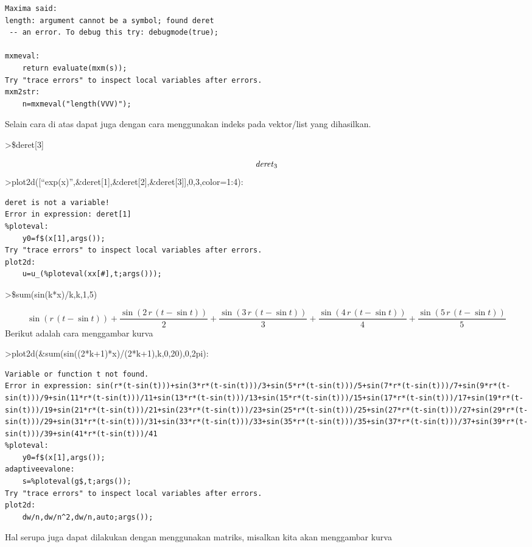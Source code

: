 \documentclass[
]{book}
\begin{document}
\begin{verbatim}
Maxima said:
length: argument cannot be a symbol; found deret
 -- an error. To debug this try: debugmode(true);

mxmeval:
    return evaluate(mxm(s));
Try "trace errors" to inspect local variables after errors.
mxm2str:
    n=mxmeval("length(VVV)");
\end{verbatim}

Selain cara di atas dapat juga dengan cara menggunakan indeks pada vektor/list yang dihasilkan.

\textgreater\$deret{[}3{]}

\[{\it deret}_{3}\]\textgreater plot2d({[}``exp(x)'',\&deret{[}1{]},\&deret{[}2{]},\&deret{[}3{]}{]},0,3,color=1:4):

\begin{verbatim}
deret is not a variable!
Error in expression: deret[1]
%ploteval:
    y0=f$(x[1],args());
Try "trace errors" to inspect local variables after errors.
plot2d:
    u=u_(%ploteval(xx[#],t;args()));
\end{verbatim}

\textgreater\$sum(sin(k*x)/k,k,1,5)

\[\sin \left(r\,\left(t-\sin t\right)\right)+\frac{\sin \left(2\,r\,\left(t-\sin t\right)\right)}{2}+\frac{\sin \left(3\,r\,\left(t- \sin t\right)\right)}{3}+\frac{\sin \left(4\,r\,\left(t-\sin t \right)\right)}{4}+\frac{\sin \left(5\,r\,\left(t-\sin t\right) \right)}{5}\]Berikut adalah cara menggambar kurva

\textgreater plot2d(\&sum(sin((2*k+1)*x)/(2*k+1),k,0,20),0,2pi):

\begin{verbatim}
Variable or function t not found.
Error in expression: sin(r*(t-sin(t)))+sin(3*r*(t-sin(t)))/3+sin(5*r*(t-sin(t)))/5+sin(7*r*(t-sin(t)))/7+sin(9*r*(t-sin(t)))/9+sin(11*r*(t-sin(t)))/11+sin(13*r*(t-sin(t)))/13+sin(15*r*(t-sin(t)))/15+sin(17*r*(t-sin(t)))/17+sin(19*r*(t-sin(t)))/19+sin(21*r*(t-sin(t)))/21+sin(23*r*(t-sin(t)))/23+sin(25*r*(t-sin(t)))/25+sin(27*r*(t-sin(t)))/27+sin(29*r*(t-sin(t)))/29+sin(31*r*(t-sin(t)))/31+sin(33*r*(t-sin(t)))/33+sin(35*r*(t-sin(t)))/35+sin(37*r*(t-sin(t)))/37+sin(39*r*(t-sin(t)))/39+sin(41*r*(t-sin(t)))/41
%ploteval:
    y0=f$(x[1],args());
adaptiveevalone:
    s=%ploteval(g$,t;args());
Try "trace errors" to inspect local variables after errors.
plot2d:
    dw/n,dw/n^2,dw/n,auto;args());
\end{verbatim}

Hal serupa juga dapat dilakukan dengan menggunakan matriks, misalkan kita akan menggambar kurva
\end{document}
